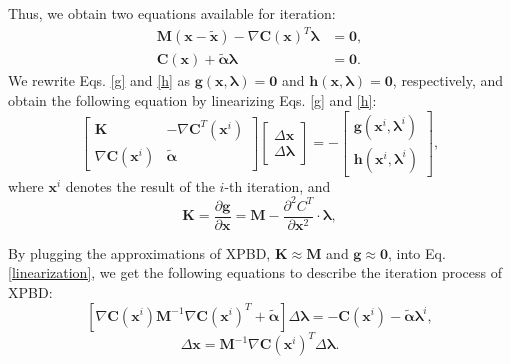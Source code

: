 \begin{frame}
Thus, we obtain two equations available for iteration:
\begin{align}
    \mathbf{M}\left(\mathbf{x}-\tilde{\mathbf{x}}\right)-\nabla \mathbf{C}\left(\mathbf{x}\right)^T \boldsymbol{\lambda}&=\mathbf{0}, \label{g}\\
    \mathbf{C}\left(\mathbf{x}\right)+\tilde{\boldsymbol{\alpha}} \boldsymbol{\lambda}&=\mathbf{0}.
    \label{h}
\end{align}
We rewrite Eqs. \ref{g} and \ref{h} as
$\mathbf{g}\left(\mathbf{x}, \boldsymbol{\lambda}\right) =\mathbf{0}$ and
    $\mathbf{h}\left(\mathbf{x}, \boldsymbol{\lambda}\right) =\mathbf{0}$, respectively,  
and obtain the following equation by linearizing Eqs. \ref{g} and \ref{h}:
\begin{equation}
    \left[\begin{array}{cc}
        \mathbf{K} & -\nabla \mathbf{C}^T\left(\mathbf{x}^i\right) \\
        \nabla \mathbf{C}\left(\mathbf{x}^i\right) & \tilde{\boldsymbol{\alpha}}
        \end{array}\right]\left[\begin{array}{l}
        \Delta \mathbf{x} \\
        \Delta \boldsymbol{\lambda}
        \end{array}\right]=-\left[\begin{array}{l}
        \mathbf{g}\left(\mathbf{x}^i, \boldsymbol{\lambda}^i\right) \\
        \mathbf{h}\left(\mathbf{x}^i, \boldsymbol{\lambda}^i\right)
    \end{array}\right],
    \label{linearization}
\end{equation}
where $\mathbf{x}^{i}$ denotes the result of the $i$-th iteration, and
\begin{equation}
    \mathbf{K}=\frac{\partial \mathbf{g}}{\partial \mathbf{x}} = \mathbf{M} - \frac{\partial^2 C^T}{\partial \mathbf{x}^2} \cdot \boldsymbol{\lambda},  \nonumber
\end{equation}
\end{frame}

\begin{frame}
By plugging the approximations of XPBD, 
    $\mathbf{K} \approx \mathbf{M}$ and 
    $\mathbf{g} \approx \mathbf{0}$,
    into Eq. \ref{linearization}, we get the following equations to describe the iteration process of XPBD:
\begin{equation}
    \left[\nabla \mathbf{C}\left(\mathbf{x}^i\right) \mathbf{M}^{-1} \nabla \mathbf{C}\left(\mathbf{x}^i\right)^T+\tilde{\boldsymbol{\alpha}}\right] \Delta \boldsymbol{\lambda}=-\mathbf{C}\left(\mathbf{x}^i\right)-\tilde{\boldsymbol{\alpha}} \boldsymbol{\lambda}^i,
    \label{iter_lambda}
\end{equation}
\begin{equation}
    \Delta \mathbf{x}=\mathbf{M}^{-1} \nabla \mathbf{C}\left(\mathbf{x}^i\right)^T \Delta \boldsymbol{\lambda}.
    \label{iter_x}
\end{equation}

\end{frame}


